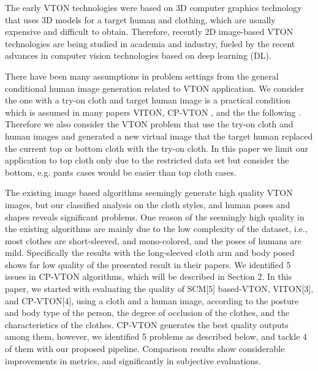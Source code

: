 \documentclass[runningheads]{llncs}
\begin{document}
The early VTON technologies were based on 3D computer graphics technology that uses 3D models for a target human and clothing, which are usually expensive and difficult to obtain. Therefore, recently 2D image-based VTON technologies are being studied in academia and industry, fueled by the recent advances in computer vision technologies based on deep learning (DL). 

There have been many assumptions in problem settings from the general conditional human image generation related to VTON application. We consider the one with a try-on cloth and target human image is a practical condition which is assumed in many papers VITON\cite{Han2017VITONAI}, CP-VTON\cite{Wang2018TowardCI} , and the the following  \cite{Sun2019ImageBasedVT,Yu_2019_ICCV}. Therefore we also consider the VTON problem that use the try-on cloth and human images and generated a new virtual image that the target human replaced the current top or bottom cloth with the try-on cloth. In this paper we limit our application to top cloth only due to the restricted data set but consider the bottom, e.g. pants cases would be easier than top cloth cases.

The existing image based algorithms seemingly generate high quality VTON images, but our classified analysis on the cloth styles, and human poses and shapes reveals significant problems. One reason of the seemingly high quality in the existing algorithms are mainly due to the low complexity of the dataset, i.e., most clothes are short-sleeved, and mono-colored, and the poses of humans are mild. Specifically the results with the long-sleeved cloth arm and body posed shows far low quality of the presented result in their papers. We identified 5 issues in CP-VTON\cite{Wang2018TowardCI} algorithms, which will be described in Section 2. In this paper, we started with evaluating the quality of SCM[5] based-VTON, VITON[3], and CP-VTON[4], using a cloth and a human image, according to the posture and body type of the person, the degree of occlusion of the clothes, and the characteristics of the clothes.  CP-VTON generates the best quality outputs among them, however, we identified 5 problems as described below, and tackle 4 of them with our proposed pipeline. Comparison results show considerable improvements in metrics, and significantly in subjective evaluations. 
\end{document}
